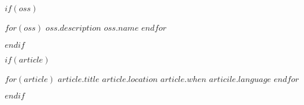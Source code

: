 \documentclass[$fontSize$, $format$]{awesome-cv}
\begin{document}
$if(oss)$
\begin{cventries}
    $for(oss)$
    \cventry
        {$oss.description$}
        {\href{$oss.url$}{$oss.name$}}
        {\large\faGithub}
        {}
        {}
    $endfor$
\end{cventries}
$endif$

$if(article)$
\begin{cventries}
    $for(article)$
    \cventry
        {$article.title$}
        {$article.location$}
        {$article.when$}
        {$articile.language$}
        {}
    $endfor$
\end{cventries}
$endif$
\end{document}
